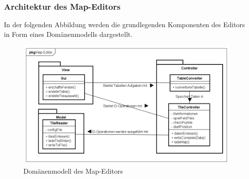 \subsubsection{Architektur des Map-Editors}
In der folgenden Abbildung werden die grundlegenden Komponenten des Editors in Form eines Domänenmodells dargestellt.\\

\begin{figure}[h]
\centering
\includegraphics[scale=0.5]{pics/mapeditor_domain.png}
\caption{Domänenmodell des Map-Editors}
\label{fig:domain_mapeditor}
\end{figure}

